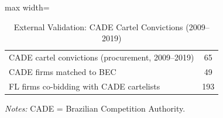 \begin{table}[htbp]
\centering
\caption{External Validation: CADE Cartel Convictions (2009--2019)}
\label{tab:cade_validation}
\begin{adjustbox}{max width=\textwidth}
\begin{threeparttable}
\small
\begin{tabular}{lc}
\toprule
\midrule
CADE cartel convictions (procurement, 2009--2019) & 65 \\
CADE firms matched to BEC & 49 \\
FL firms co-bidding with CADE cartelists & 193 \\
\bottomrule
\end{tabular}
\begin{tablenotes}
\small
\item \textit{Notes:} CADE = Brazilian Competition Authority.
\end{tablenotes}
\end{threeparttable}
\end{adjustbox}
\end{table}
